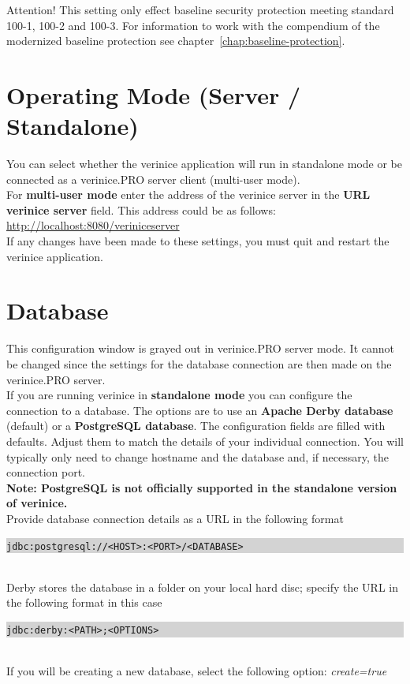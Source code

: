 \documentclass[a4paper,10pt]{book}
\begin{document}
Attention! This setting only effect baseline security protection
meeting standard 100-1, 100-2 and 100-3.
For information to work with the compendium of the modernized baseline
protection see chapter~\ref{chap:baseline-protection}.

\section{Operating Mode (Server / Standalone)}
You can select whether the verinice application will run in standalone mode or be connected as a
verinice.\textsc{PRO} server client (multi-user mode).
\newline\\
For \textbf{multi-user mode} enter the address of the verinice server in the \textbf{URL verinice server} field.
This address could be as follows: \newline
\href{http://localhost:8080/veriniceserver}{http://localhost:8080/veriniceserver}
\newline\\
If any changes have been made to these settings, you must quit and restart the verinice application.

\section{Database}
\label{sec:database}
This configuration window is grayed out in verinice.\textsc{PRO} server mode. It cannot be changed
since the settings for the database connection are then made on the verinice.\textsc{PRO} server.
\newline\\
If you are running verinice in \textbf{standalone mode} you can configure the connection to a database.
The options are to use an \textbf{Apache Derby database} (default) or a \textbf{PostgreSQL database}.
The configuration fields are filled with defaults. Adjust them to match the details of your individual
connection. You will typically only need to change hostname and the database and, if necessary,
the connection port.
\newline\\
\textbf{Note: PostgreSQL is not officially supported in the standalone version of verinice.}
\newline\\
Provide database connection details as a URL in the following format
\newline\\
\colorbox{lightgray}{\parbox{\textwidth}{
{\tt jdbc:postgresql://<HOST>:<PORT>/<DATABASE>}
}}
\newline\\
Derby stores the database in a folder on your local hard disc; specify the URL in the following format in this case
\newline\\
\colorbox{lightgray}{\parbox{\textwidth}{
{\tt jdbc:derby:<PATH>;<OPTIONS>}
}}
\newline\\
If you will be creating a new database, select the following option: {\em create=true}
\end{document}
